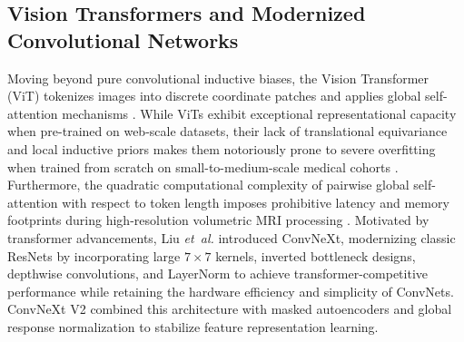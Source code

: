 \subsection{Vision Transformers and Modernized Convolutional Networks}
Moving beyond pure convolutional inductive biases, the Vision Transformer (ViT) \cite{6} tokenizes images into discrete coordinate patches and applies global self-attention mechanisms \cite{33}. While ViTs exhibit exceptional representational capacity when pre-trained on web-scale datasets, their lack of translational equivariance and local inductive priors makes them notoriously prone to severe overfitting when trained from scratch on small-to-medium-scale medical cohorts \cite{19}. Furthermore, the quadratic computational complexity of pairwise global self-attention with respect to token length imposes prohibitive latency and memory footprints during high-resolution volumetric MRI processing \cite{6, 46}. Motivated by transformer advancements, Liu \emph{et~al.} \cite{24} introduced ConvNeXt, modernizing classic ResNets by incorporating large $7\times7$ kernels, inverted bottleneck designs, depthwise convolutions, and LayerNorm to achieve transformer-competitive performance while retaining the hardware efficiency and simplicity of ConvNets. ConvNeXt V2 \cite{34} combined this architecture with masked autoencoders and global response normalization to stabilize feature representation learning.

